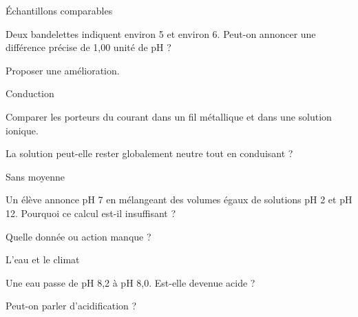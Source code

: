 \clearpage{}
\par\noindent\begin{minipage}{\linewidth}
\begin{exercice}[3]{Échantillons comparables}
\begin{questions}
\item Deux bandelettes indiquent environ 5 et environ 6. Peut-on annoncer une différence précise de 1,00 unité de pH ?
\item Proposer une amélioration.
\end{questions}
\end{exercice}
\end{minipage}
\par\noindent\begin{minipage}{\linewidth}
\begin{exercice}[3]{Conduction}
\begin{questions}
\item Comparer les porteurs du courant dans un fil métallique et dans une solution ionique.
\item La solution peut-elle rester globalement neutre tout en conduisant ?
\end{questions}
\end{exercice}
\end{minipage}
\par\noindent\begin{minipage}{\linewidth}
\begin{exercice}[3]{Sans moyenne}
\begin{questions}
\item Un élève annonce pH 7 en mélangeant des volumes égaux de solutions pH 2 et pH 12. Pourquoi ce calcul est-il insuffisant ?
\item Quelle donnée ou action manque ?
\end{questions}
\end{exercice}
\end{minipage}
\par\noindent\begin{minipage}{\linewidth}
\begin{exercice}[3]{L’eau et le climat}
\begin{questions}
\item Une eau passe de pH 8,2 à pH 8,0. Est-elle devenue acide ?
\item Peut-on parler d’acidification ?
\end{questions}
\end{exercice}
\end{minipage}

